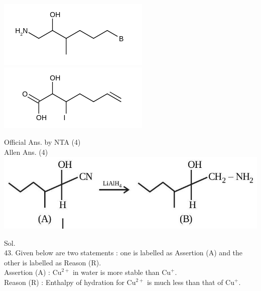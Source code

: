 \documentclass[10pt]{article}
\begin{document}
\includegraphics{smile-f3ac4c46d91342c877a1d3e0fa8a218360879b3e}\\
\includegraphics{smile-ae17fe8e360f820e334aea0ccf4ef6651bfae28c}

Official Ans. by NTA (4)\\
Allen Ans. (4)\\
\includegraphics[max width=\textwidth, center]{2025_10_02_a54bf82dc4585184bb5fg-3(1)}

Sol.\\
43. Given below are two statements : one is labelled as Assertion (A) and the other is labelled as Reason (R).\\
Assertion (A) : \(\mathrm{Cu}^{2+}\) in water is more stable than \(\mathrm{Cu}^{+}\).\\
Reason (R) : Enthalpy of hydration for \(\mathrm{Cu}^{2+}\) is much less than that of \(\mathrm{Cu}^{+}\).
\end{document}
